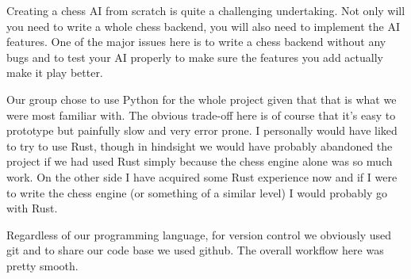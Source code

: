 Creating a chess AI from scratch is quite a challenging undertaking.
Not only will you need to write a whole chess backend, you will also
need to implement the AI features. One of the major issues here
is to write a chess backend without any bugs and to test your
AI properly to make sure the features you add actually make it
play better.

Our group chose to use Python for the whole project given
that that is what we were most familiar with.
The obvious trade-off here is of course that it's easy
to prototype but painfully slow and very error prone.
I personally would have liked to try to use Rust,
though in hindsight we would have probably abandoned
the project if we had used Rust simply because
the chess engine alone was so much work.
On the other side I have acquired some Rust experience
now and if I were to write the chess engine
(or something of a similar level) I would probably
go with Rust.

Regardless of our programming language, for version control
we obviously used git and to share our code base we used github.
The overall workflow here was pretty smooth.
